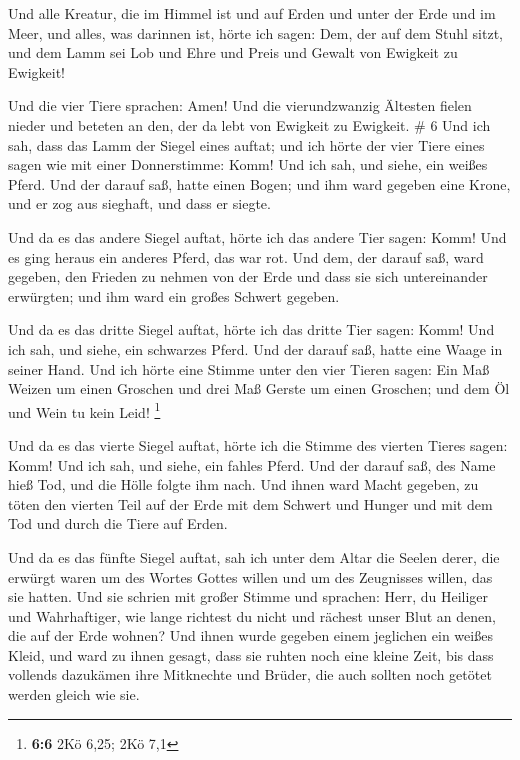  Und alle Kreatur, die im Himmel ist und auf Erden und
unter der Erde und im Meer, und alles, was darinnen ist, hörte ich
sagen: Dem, der auf dem Stuhl sitzt, und dem Lamm sei Lob und Ehre und
Preis und Gewalt von Ewigkeit zu Ewigkeit!

 Und die vier Tiere sprachen: Amen! Und die vierundzwanzig
Ältesten fielen nieder und beteten an den, der da lebt von Ewigkeit zu
Ewigkeit. \# 6  Und ich sah, dass das Lamm der Siegel eines
auftat; und ich hörte der vier Tiere eines sagen wie mit einer
Donnerstimme: Komm!  Und ich sah, und siehe, ein weißes
Pferd. Und der darauf saß, hatte einen Bogen; und ihm ward gegeben eine
Krone, und er zog aus sieghaft, und dass er siegte.

 Und da es das andere Siegel auftat, hörte ich das andere
Tier sagen: Komm!  Und es ging heraus ein anderes Pferd, das
war rot. Und dem, der darauf saß, ward gegeben, den Frieden zu nehmen
von der Erde und dass sie sich untereinander erwürgten; und ihm ward ein
großes Schwert gegeben.

 Und da es das dritte Siegel auftat, hörte ich das dritte
Tier sagen: Komm! Und ich sah, und siehe, ein schwarzes Pferd. Und der
darauf saß, hatte eine Waage in seiner Hand.  Und ich hörte
eine Stimme unter den vier Tieren sagen: Ein Maß Weizen um einen
Groschen und drei Maß Gerste um einen Groschen; und dem Öl und Wein tu
kein Leid! \footnote{\textbf{6:6} 2Kö 6,25; 2Kö 7,1}

 Und da es das vierte Siegel auftat, hörte ich die Stimme
des vierten Tieres sagen: Komm!  Und ich sah, und siehe, ein
fahles Pferd. Und der darauf saß, des Name hieß Tod, und die Hölle
folgte ihm nach. Und ihnen ward Macht gegeben, zu töten den vierten Teil
auf der Erde mit dem Schwert und Hunger und mit dem Tod und durch die
Tiere auf Erden.

 Und da es das fünfte Siegel auftat, sah ich unter dem Altar
die Seelen derer, die erwürgt waren um des Wortes Gottes willen und um
des Zeugnisses willen, das sie hatten.  Und sie schrien mit
großer Stimme und sprachen: Herr, du Heiliger und Wahrhaftiger, wie
lange richtest du nicht und rächest unser Blut an denen, die auf der
Erde wohnen?  Und ihnen wurde gegeben einem jeglichen ein
weißes Kleid, und ward zu ihnen gesagt, dass sie ruhten noch eine kleine
Zeit, bis dass vollends dazukämen ihre Mitknechte und Brüder, die auch
sollten noch getötet werden gleich wie sie.

